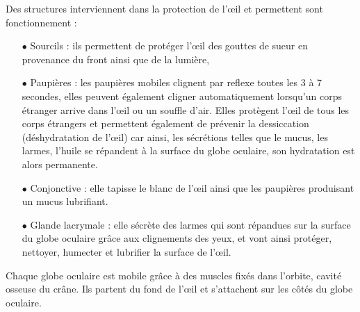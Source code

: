 \documentclass[a4paper, 12pt, onecolumn, openany]{report}
\begin{document}
    Des structures interviennent dans la protection de l’œil et permettent sont fonctionnement :
    \begin{itemize}
   	\item[$\bullet$] Sourcils : ils permettent de protéger l’œil des gouttes de sueur en provenance du front ainsi que de la lumière,
	\item[$\bullet$] Paupières : les paupières mobiles clignent par reflexe toutes les 3 à 7 secondes, elles peuvent également cligner automatiquement lorsqu’un corps étranger arrive dans l’œil ou un souffle d’air.  Elles protègent l’œil de tous les corps étrangers et permettent également de prévenir la dessiccation (déshydratation de l’œil) car ainsi, les sécrétions telles que le mucus, les larmes, l’huile se répandent à la surface du globe oculaire, son hydratation est alors permanente.  
	\item[$\bullet$] Conjonctive : elle tapisse le blanc de l’œil ainsi que les paupières produisant un mucus lubrifiant.
	\item[$\bullet$] Glande lacrymale : elle sécrète des larmes qui sont répandues sur la surface du globe oculaire grâce aux clignements des yeux, et vont ainsi protéger, nettoyer, humecter et lubrifier la surface de l’œil.
	\end{itemize}	
	
	Chaque globe oculaire est mobile grâce à des muscles fixés dans l’orbite, cavité osseuse du crâne. Ils partent du fond de l’œil et s’attachent sur les côtés du globe oculaire. 
	
\end{document}
